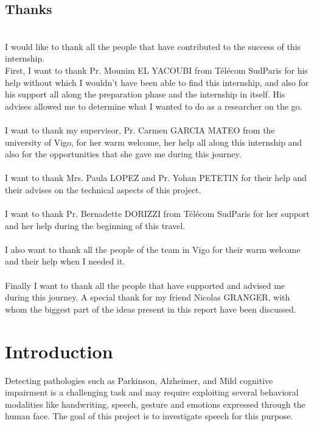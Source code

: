 \documentclass{report}
\begin{document}
	\tableofcontents
	
	\newpage

	\section*{Thanks}

	~\\[0.5cm]
	I would like to thank all the people that have contributed to the success of this internship.
	\\[1cm]


	First, I want to thank Pr. Mounim EL YACOUBI from Télécom SudParis for his help without which I wouldn't have been able to find this internship, and also for his support all along the preparation phase and the internship in itself. His advises allowed me to determine what I wanted to do as a researcher on the go.\\\\
	I want to thank my supervisor, Pr. Carmen GARCIA MATEO from the university of Vigo, for her warm welcome, her help all along this internship and also for the opportunities that she gave me during this journey.\\\\
	I want to thank Mrs. Paula LOPEZ and Pr. Yohan PETETIN for their help and their advises on the technical aspects of this project.\\\\
	I want to thank Pr. Bernadette DORIZZI from Télécom SudParis for her support and her help during the beginning of this travel.\\\\
	I also want to thank all the people of the team in Vigo for their warm welcome and their help when I needed it.\\\\

	Finally I want to thank all the people that have supported and advised me during this journey. A special thank for my friend Nicolas GRANGER, with whom the biggest part of the ideas present in this report have been discussed.

	\newpage
	
	\chapter{Introduction}
	
	Detecting pathologies such as Parkinson, Alzheimer, and Mild cognitive impairment is a challenging task and may require exploiting several behavioral modalities like handwriting, speech, gesture and emotions expressed through the human face. The goal of this project is to investigate speech for this purpose.\\
	
\end{document}
